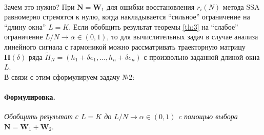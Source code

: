 \documentclass[specialist,
substylefile = spbu_report.rtx,
subf,href,colorlinks=true, 12pt]{disser}
\newenvironment{formulation}{\paragraph{Формулировка.}}{\hfill}
\begin{document}
	\\
	Зачем это нужно? При $\mathbf{N} = \mathbf{W}_1$ для ошибки восстановления $r_i(N)$ метода SSA равномерно стремятся к нулю, когда накладывается ``сильное'' ограничение на ``длину окна'' $L = K$. Если обобщить результат теоремы \eqref{th:3} на ``слабое'' ограничение $L/N\rightarrow\alpha\in(0,1)$, то для вычислительных задач в случае анализа линейного сигнала с гармоникой можно рассматривать траекторную матрицу $\mathbf{H}(\delta)$ ряда $\widetilde{H}_N=(h_1 + \delta e_1, \dots, h_n+\delta e_n)$ с произвольно заданной длиной окна $L$.
	\\
	В связи с этим сформулируем задачу №2:
	\begin{formulation}
		\emph{Обобщить результат \cite{ZNekrutkin} с $L=K$ до $L/N\to \alpha \in (0,1)$ c помощью выбора $\mathbf{N}=\mathbf{W}_1+\mathbf{W}_2$}.
	\end{formulation}
\end{document}
